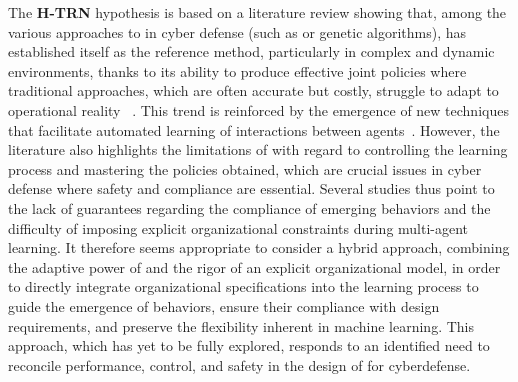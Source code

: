 \medskip

\noindent The \textbf{H-TRN} hypothesis is based on a literature review showing that, among the various approaches to  in cyber defense (such as  or genetic algorithms),  has established itself as the reference method, particularly in complex and dynamic environments, thanks to its ability to produce effective joint policies where traditional approaches, which are often accurate but costly, struggle to adapt to operational reality~\cite{Zhang2021} . This trend is reinforced by the emergence of new techniques that facilitate automated learning of interactions between agents~\cite{foerster2018communication}. However, the literature also highlights the limitations of  with regard to controlling the learning process and mastering the policies obtained, which are crucial issues in cyber defense where safety and compliance are essential. Several studies thus point to the lack of guarantees regarding the compliance of emerging behaviors and the difficulty of imposing explicit organizational constraints during multi-agent learning. It therefore seems appropriate to consider a hybrid approach, combining the adaptive power of  and the rigor of an explicit organizational model, in order to directly integrate organizational specifications into the learning process to guide the emergence of behaviors, ensure their compliance with design requirements, and preserve the flexibility inherent in machine learning. This approach, which has yet to be fully explored, responds to an identified need to reconcile performance, control, and safety in the design of  for cyberdefense.

\medskip

